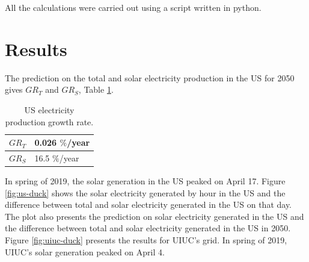 \documentclass{anstrans}
\begin{document}



All the calculations were carried out using a script written in python.

\section{Results}
\label{results}

The prediction on the total and solar electricity production in the \gls{US} for 2050 gives $GR_T$ and $GR_S$, Table \ref{tab:grate}.

\begin{table}[!htb]
    \begin{tabular}{|l|l|}
        \hline
        $GR_T$ & 0.026 $\%$/year \\ \hline
        $GR_S$ & 16.5 $\%$/year \\ \hline
    \end{tabular}
    \caption{\gls{US} electricity production growth rate.}
    \label{tab:grate}
\end{table}

In spring of 2019, the solar generation in the \gls{US} peaked on April 17.
Figure \ref{fig:us-duck} shows the solar electricity generated by hour in the \gls{US} and the difference between total and solar electricity generated in the \gls{US} on that day.
The plot also presents the prediction on solar electricity generated in the \gls{US} and the difference between total and solar electricity generated in the \gls{US} in 2050.
Figure \ref{fig:uiuc-duck} presents the results for UIUC's grid.
In spring of 2019, UIUC's solar generation peaked on April 4.
\end{document}
